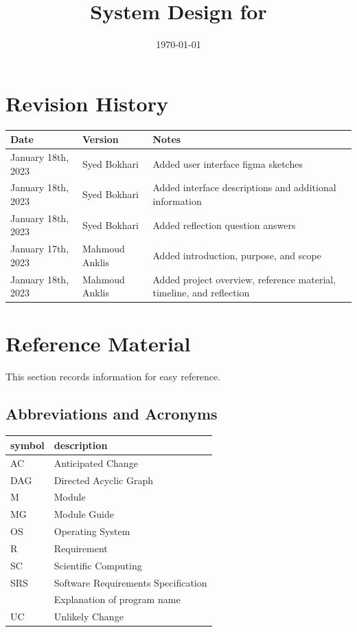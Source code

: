 \documentclass[12pt, titlepage]{article}
\begin{document}
	
	\title{System Design for \progname{}} 
	\author{\authname}
	\date{\today}
	
	\maketitle
	
	
	\section{Revision History}
	
	\begin{tabularx}{\textwidth}{p{3cm}p{2cm}X}
		\toprule {\bf Date} & {\bf Version} & {\bf Notes}\\
		\midrule
		January 18th, 2023 & Syed Bokhari & Added user interface figma sketches\\
		January 18th, 2023 & Syed Bokhari & Added interface descriptions and additional information\\
		January 18th, 2023 & Syed Bokhari & Added reflection question answers\\
		January 17th, 2023 & Mahmoud Anklis & Added introduction, purpose, and scope\\
		January 18th, 2023 & Mahmoud Anklis & Added project overview, reference material, timeline, and reflection\\
		\bottomrule
	\end{tabularx}
	
	\newpage
	
	\section{Reference Material}
	
	This section records information for easy reference.
	
	\subsection{Abbreviations and Acronyms}
	
\renewcommand{\arraystretch}{1.2}
\begin{tabular}{l l} 
	\toprule		
	\textbf{symbol} & \textbf{description}\\
	\midrule 
	AC & Anticipated Change\\
	DAG & Directed Acyclic Graph \\
	M & Module \\
	MG & Module Guide \\
	OS & Operating System \\
	R & Requirement\\
	SC & Scientific Computing \\
	SRS & Software Requirements Specification\\
	\progname & Explanation of program name\\
	UC & Unlikely Change \\
	\bottomrule
\end{tabular}\\
	
\end{document}
